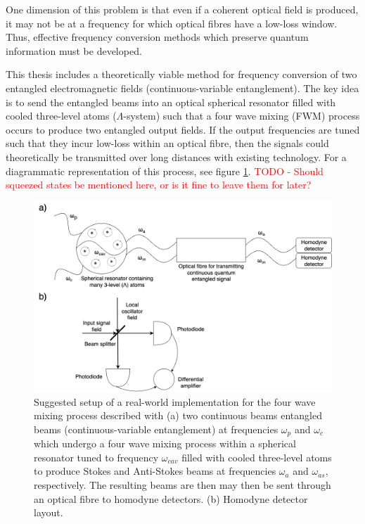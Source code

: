 \documentclass[aps,pra,twocolumn,showpacs,amsmath,amssymb,nofootinbib,longbibliography,superscriptaddress
]{revtex4-1}
\theoremstyle{definition}
\theoremstyle{remark}
\newcommand{\0}{\hat{0}}
\begin{document}
One dimension of this problem is that even if a coherent optical field is produced, it may not be at a frequency for which optical fibres have a low-loss window. Thus, effective frequency conversion methods which preserve quantum information must be developed.

This thesis includes a theoretically viable method for frequency conversion of two entangled electromagnetic fields (continuous-variable entanglement). The key idea is to send the entangled beams into an optical spherical resonator filled with cooled three-level atoms ($\Lambda$-system) such that a four wave mixing (FWM) process occurs to produce two entangled output fields. If the output frequencies are tuned such that they incur low-loss within an optical fibre, then the signals could theoretically be transmitted over long distances with existing technology. For a diagrammatic representation of this process, see figure \ref{SphericalResonator}. \textcolor{red}{TODO - Should squeezed states be mentioned here, or is it fine to leave them for later?}

\begin{figure}%
    \includegraphics[width=\columnwidth]{SphericalResonatorAndHomodyne.png}
    \caption{Suggested setup of a real-world implementation for the four wave mixing process described with (a) two continuous beams entangled beams (continuous-variable entanglement) at frequencies $\omega_p$ and $\omega_c$ which undergo a four wave mixing process within a spherical resonator tuned to frequency $\omega_{cav}$ filled with cooled three-level atoms to produce Stokes and Anti-Stokes beams at frequencies $\omega_a$ and $\omega_{as}$, respectively. The resulting beams are then may then be sent through an optical fibre to homodyne detectors. (b) Homodyne detector layout.}
    \label{SphericalResonator}
\end{figure}
\end{document}
